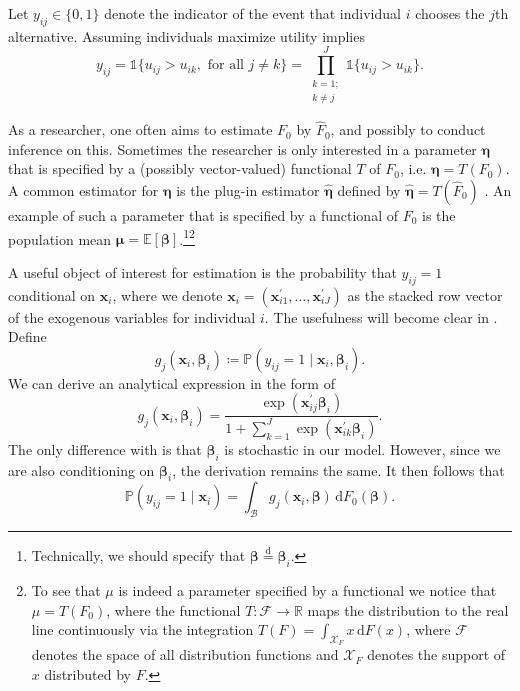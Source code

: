 Let $y_{ij} \in \{0,1\}$ denote the indicator of the event that individual $i$ chooses the $j$th alternative. 
Assuming individuals maximize utility implies
\begin{equation}
\label{eq:mxlydef}
    y_{ij} = \mathds{1}\{u_{ij} > u_{ik}, \text{ for all } j \neq k\} = \prod_{\substack{k=1; \\ k\neq j}}^{J}\mathds{1}\{u_{ij} > u_{ik}\}.
\end{equation}

As a researcher, one often aims to estimate $F_0$ by $\hat{F}_0$, and possibly to conduct inference on this.
Sometimes the researcher is only interested in a parameter $\bm{\eta}$ that is specified by a (possibly vector-valued) functional $T$ of $F_0$, i.e. $\bm{\eta} = T(F_0)$.
A common estimator for $\bm{\eta}$ is the plug-in estimator $\hat{\bm{\eta}}$ defined by $\hat{\bm{\eta}} = T(\hat{F}_0)$ \citep[see][chap.~23]{vanderVaart1998}.
An example of such a parameter that is specified by a functional of $F_0$ is the population mean $\bm{\mu} = \mathbb{E}[\bm{\beta}]$.\footnote{Technically, we should specify that $\bm{\beta}\overset{\mathrm{d}}{=}\bm{\beta}_i$.}\footnote{To see that $\mu$ is indeed a parameter specified by a functional we notice that $\mu = T(F_0)$, where the functional $T: \mathcal{F} \to \mathbb{R}$ maps the distribution to the real line continuously via the integration $T(F) = \int_{\mathcal{X}_F} x \, \mathrm{d}F(x)$, where $\mathcal{F}$ denotes the space of all distribution functions and $\mathcal{X}_F$ denotes the support of $x$ distributed by $F$.}

A useful object of interest for estimation is the probability that $y_{ij} = 1$ conditional on $\bm{x}_i$, where we denote $\bm{x}_i = (\bm{x}_{i1}^\prime,\ldots,\bm{x}_{iJ}^\prime)$ as the stacked row vector of the exogenous variables for individual $i$.
The usefulness will become clear in .
Define
\begin{equation}
\label{eq:mxlgdef}
    g_j(\bm{x}_{i},\bm{\beta}_{i}) \coloneq \mathbb{P}(y_{ij} = 1 \mid \bm{x}_i, \bm{\beta}_i).
\end{equation}
We can derive an analytical expression \citep[see][chap.~3]{Maddala1983} in the form of
\begin{equation}
\label{eq:mxlganalytical}
    g_j(\bm{x}_{i},\bm{\beta}_{i}) = \frac{\exp{(\bm{x}_{ij}^\prime \bm{\beta}_i)}}{1 + \sum_{k=1}^{J}\exp{(\bm{x}_{ik}^\prime \bm{\beta}_i)}}.
\end{equation}
The only difference with \citet{Maddala1983} is that $\bm{\beta}_i$ is stochastic in our model. 
However, since we are also conditioning on $\bm{\beta}_i$, the derivation remains the same.
It then follows that
\begin{equation}
\label{eq:mxlcondprob}
    \mathbb{P}(y_{ij} = 1 \mid \bm{x}_{i}) = \int_{\mathcal{B}} g_j(\bm{x}_{i}, \bm{\beta}) \, \mathrm{d}F_{0}(\bm{\beta}).
\end{equation}

